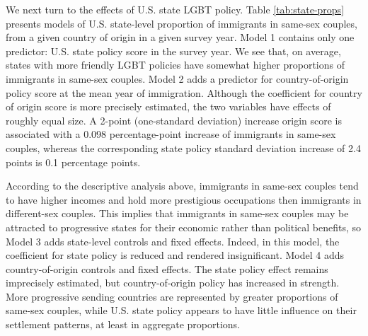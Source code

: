 \documentclass[
  11pt,
]{article}
\begin{document}
We next turn to the effects of U.S. state LGBT policy. Table \ref{tab:state-props} presents models of U.S. state-level proportion of immigrants in same-sex couples, from a given country of origin in a given survey year. Model 1 contains only one predictor: U.S. state policy score in the survey year. We see that, on average, states with more friendly LGBT policies have somewhat higher proportions of immigrants in same-sex couples. Model 2 adds a predictor for country-of-origin policy score at the mean year of immigration. Although the coefficient for country of origin score is more precisely estimated, the two variables have effects of roughly equal size. A 2-point (one-standard deviation) increase origin score is associated with a 0.098 percentage-point increase of immigrants in same-sex couples, whereas the corresponding state policy standard deviation increase of 2.4 points is 0.1 percentage points.

According to the descriptive analysis above, immigrants in same-sex couples tend to have higher incomes and hold more prestigious occupations then immigrants in different-sex couples. This implies that immigrants in same-sex couples may be attracted to progressive states for their economic rather than political benefits, so Model 3 adds state-level controls and fixed effects. Indeed, in this model, the coefficient for state policy is reduced and rendered insignificant. Model 4 adds country-of-origin controls and fixed effects. The state policy effect remains imprecisely estimated, but country-of-origin policy has increased in strength. More progressive sending countries are represented by greater proportions of same-sex couples, while U.S. state policy appears to have little influence on their settlement patterns, at least in aggregate proportions.
\end{document}
